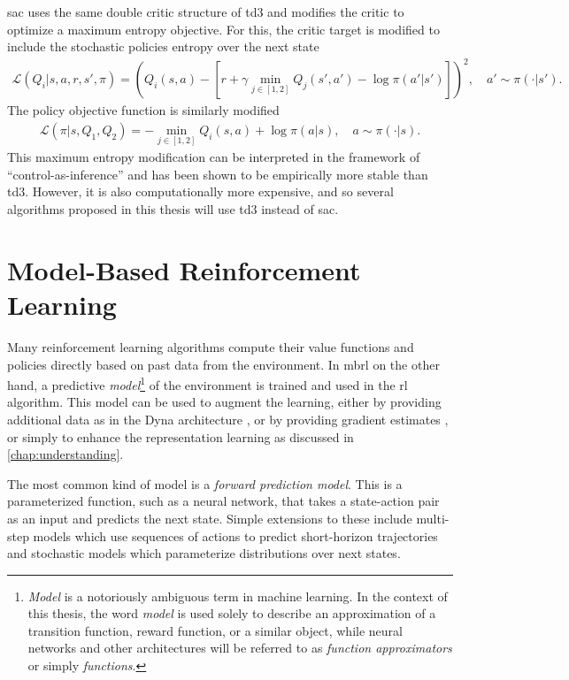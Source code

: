 \ac{sac} uses the same double critic structure of \ac{td3} and modifies the critic to optimize a maximum entropy objective.
For this, the critic target is modified to include the stochastic policies entropy over the next state
\begin{align}
    \mathcal{L}(Q_i| s, a, r, s', \pi) = \left(Q_i(s,a) - \left[r + \gamma \min_{j \in [1,2]}Q_j(s', a') - \log \pi(a'|s')\right]\right)^2, \quad a'\sim\pi(\cdot|s').
\end{align}
The policy objective function is similarly modified
\begin{align}
    \mathcal{L}(\pi| s, Q_1, Q_2) = - \min_{j \in [1,2]} Q_i(s, a) + \log \pi(a|s), \quad a\sim\pi(\cdot|s).
\end{align}
This maximum entropy modification can be interpreted in the framework of ``control-as-inference'' and has been shown to be empirically more stable than \ac{td3}.
However, it is also computationally more expensive, and so several algorithms proposed in this thesis will use \ac{td3} instead of \ac{sac}.

\section{Model-Based Reinforcement Learning}
\label{sec:model_learning}

Many reinforcement learning algorithms compute their value functions and policies directly based on past data from the environment.
In \ac{mbrl} on the other hand, a predictive \emph{model}\footnote{\emph{Model} is a notoriously ambiguous term in machine learning. In the context of this thesis, the word \emph{model} is used solely to describe an approximation of a transition function, reward function, or a similar object, while neural networks and other architectures will be referred to as \emph{function approximators} or simply \emph{functions}.} of the environment is trained and used in the \ac{rl} algorithm.
This model can be used to augment the learning, either by providing additional data as in the Dyna architecture \parencite{dyna}, or by providing gradient estimates \parencite{hafner2020dream,amos2021modelbased}, or simply to enhance the representation learning as discussed in \autoref{chap:understanding}.

The most common kind of model is a \emph{forward prediction model}.
This is a parameterized function, such as a neural network, that takes a state-action pair as an input and predicts the next state.
Simple extensions to these include multi-step models which use sequences of actions to predict short-horizon trajectories and stochastic models which parameterize distributions over next states.

